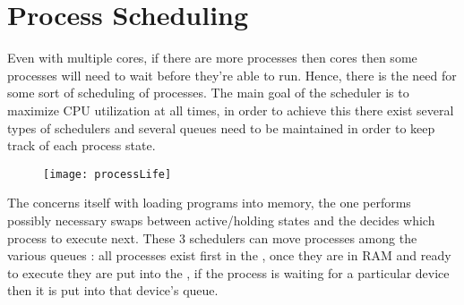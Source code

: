 \section{Process Scheduling}








	\par{Even with multiple cores, if there are more processes then cores then some processes will need to wait before they're able to run. Hence, there is the need for some sort of scheduling of processes. The main goal of the scheduler is to maximize CPU utilization at all times, in order to achieve this there exist several types of schedulers and several queues need to be maintained in order to keep track of each process state.}

	\begin{figure}[H]
		\begin{center}
		\texttt{[image: processLife]}
		\end{center}
	\end{figure}

	\par{The  concerns itself with loading programs into memory, the  one performs possibly necessary swaps between active/holding states and the  decides which process to execute next. These 3 schedulers can move processes among the various queues : all processes exist first in the , once they are in RAM and ready to execute they are put into the , if the process is waiting for a particular device then it is put into that device's queue.} 

